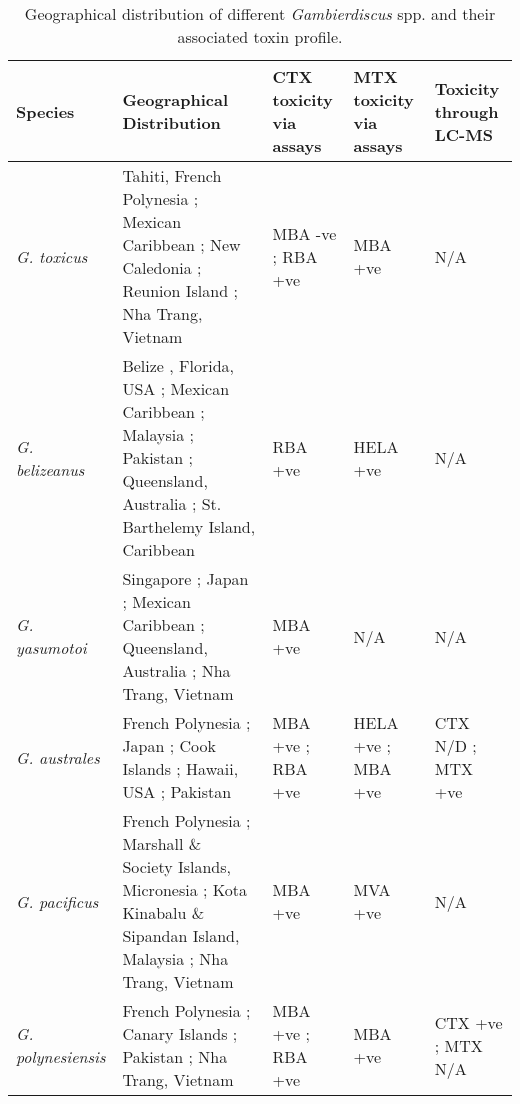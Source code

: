 \documentclass[12pt]{article}
\begin{document}
	\begin{landscape}
	\begin{longtable}{ | p{2.5cm} | p{7cm} | p{3cm} | p{3cm} | p{3.5cm} | }
	\caption{Geographical distribution of different \emph{Gambierdiscus} spp. and their associated toxin profile.} \\
	\hline
	\textbf{Species} & \textbf{Geographical Distribution} & \textbf{CTX toxicity via assays} & \textbf{MTX toxicity via assays} & \textbf{Toxicity through LC-MS} \\
	\hline
	\emph{G. toxicus} & Tahiti, French Polynesia \cite{adachi1979thecal,chinain1999morphology}; Mexican Caribbean \cite{hernandez2004species}; New Caledonia \cite{chinain1999morphology}; Reunion Island \cite{chinain1999morphology}; Nha Trang, Vietnam \cite{roeder2010characteristic} & MBA -ve \cite{chinain1999morphology}; RBA +ve \cite{chinain2010growth} & MBA +ve \cite{chinain1999morphology} & N/A \\
	\hline
	\emph{G. belizeanus} & Belize \cite{faust1995observation}, Florida, USA \cite{litaker2009taxonomy}; Mexican Caribbean \cite{hernandez2004species}; Malaysia \cite{}; Pakistan \cite{munir2011occurrence}; Queensland, Australia \cite{}; St. Barthelemy Island, Caribbean \cite{litaker2010global} & RBA +ve \cite{chinain2010growth} & HELA +ve \cite{holland2013differences} & N/A \\
	\hline
	\emph{G. yasumotoi} & Singapore \cite{holmes1998gambierdiscus}; Japan \cite{nishimura2013genetic}; Mexican Caribbean \cite{hernandez2004species}; Queensland, Australia \cite{}; Nha Trang, Vietnam \cite{} & MBA +ve \cite{} & N/A & N/A \\
	\hline
	\emph{G. australes} & French Polynesia \cite{chinain1999morphology}; Japan \cite{nishimura2013genetic}; Cook Islands \cite{rhodes2010toxic}; Hawaii, USA \cite{litaker2009taxonomy}; Pakistan \cite{munir2011occurrence} & MBA +ve \cite{rhodes2010toxic}; RBA +ve \cite{chinain2010growth} & HELA +ve \cite{holland2013differences}; MBA +ve \cite{rhodes2010toxic} & CTX N/D \cite{}; MTX +ve \cite{}\\
	\hline
	\emph{G. pacificus} & French Polynesia \cite{chinain1999morphology}; Marshall \& Society Islands, Micronesia \cite{litaker2010global}; Kota Kinabalu \& Sipandan Island, Malaysia \cite{mohammad2005marine}; Nha Trang, Vietnam \cite{} & MBA +ve \cite{chinain1999morphology} & MVA +ve \cite{chinain1999morphology} & N/A \\
	\hline
	\emph{G. polynesiensis} & French Polynesia \cite{chinain1999morphology}; Canary Islands \cite{fraga2011gambierdiscus}; Pakistan \cite{munir2011occurrence}; Nha Trang, Vietnam \cite{} & MBA +ve \cite{chinain1999morphology}; RBA +ve \cite{chinain2010growth} & MBA +ve \cite{chinain1999morphology} & CTX +ve \cite{chinain2010growth}; MTX N/A \\

\end{longtable}
\end{landscape}
\end{document}
